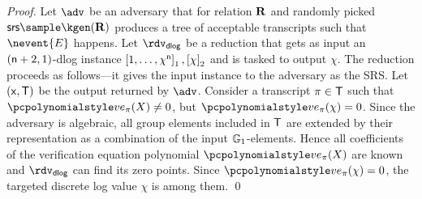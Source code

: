 \documentclass[runningheads,11pt]{llncs}
\theoremstyle{definition} \newtheorem{definition}[theorem]{Definition}
\begin{document}
\begin{proof}
   Let $\adv$ be an adversary that for relation
  $\mathbf{R}$ and randomly picked $\srs \sample \kgen(\REL)$ produces a tree of
  acceptable transcripts such that $\nevent{E}$ happens. Let $\rdvdlog$ be a
  reduction that gets as input an $(\mathsf{n} + 2, 1)$-dlog instance
  $\left[1, \ldots, \chi^{\mathsf{n}}\right]_{1}, \left[\chi\right]_{2}$ and is tasked to output
  $\chi$. The reduction proceeds as follows---it gives the input instance to the
  adversary as the SRS. Let $(\mathsf{x}, \mathsf{T})$ be the output returned by $\adv$.
  Consider a transcript $\pi \in \mathsf{T}$ such that
  $\vereq_\zkproof(X) \neq 0$, but $\vereq_\zkproof(\chi) = 0$. Since the
  adversary is algebraic, all group elements included in $\mathsf{T}$ are extended by
  their representation as a combination of the input $\mathbb{G}_1$-elements. Hence all coefficients of
  the verification equation polynomial $\vereq_\zkproof(X)$ are known and $\rdvdlog$ can
  find its zero points. Since $\vereq_\zkproof(\chi) = 0$, the targeted discrete log
  value $\chi$ is among them. \qed
\end{proof}
\end{document}
